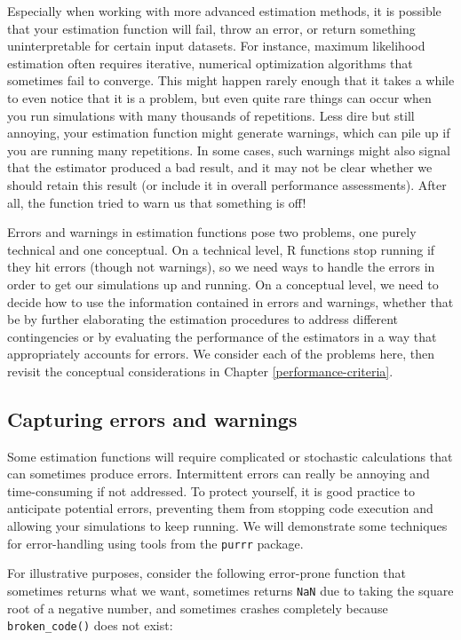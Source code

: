 \documentclass[
]{book}
\begin{document}
Especially when working with more advanced estimation methods, it is possible that your estimation function will fail, throw an error, or return something uninterpretable for certain input datasets.
For instance, maximum likelihood estimation often requires iterative, numerical optimization algorithms that sometimes fail to converge.
This might happen rarely enough that it takes a while to even notice that it is a problem, but even quite rare things can occur when you run simulations with many thousands of repetitions.
Less dire but still annoying, your estimation function might generate warnings, which can pile up if you are running many repetitions.
In some cases, such warnings might also signal that the estimator produced a bad result, and
it may not be clear whether we should retain this result (or include it in overall performance assessments).
After all, the function tried to warn us that something is off!

Errors and warnings in estimation functions pose two problems, one purely technical and one conceptual.
On a technical level, R functions stop running if they hit errors (though not warnings), so we need ways to handle the errors in order to get our simulations up and running.
On a conceptual level, we need to decide how to use the information contained in errors and warnings, whether that be by further elaborating the estimation procedures to address different contingencies or by evaluating the performance of the estimators in a way that appropriately accounts for errors.
We consider each of the problems here, then revisit the conceptual considerations in Chapter \ref{performance-criteria}.

\subsection{Capturing errors and warnings}\label{capturing-errors-and-warnings}

Some estimation functions will require complicated or stochastic calculations that can sometimes produce errors.
Intermittent errors can really be annoying and time-consuming if not addressed.
To protect yourself, it is good practice to anticipate potential errors, preventing them from stopping code execution and allowing your simulations to keep running.
We will demonstrate some techniques for error-handling using tools from the \texttt{purrr} package.

For illustrative purposes, consider the following error-prone function that sometimes returns what we want, sometimes returns \texttt{NaN} due to taking the square root of a negative number, and sometimes crashes completely because \texttt{broken\_code()} does not exist:
\end{document}
